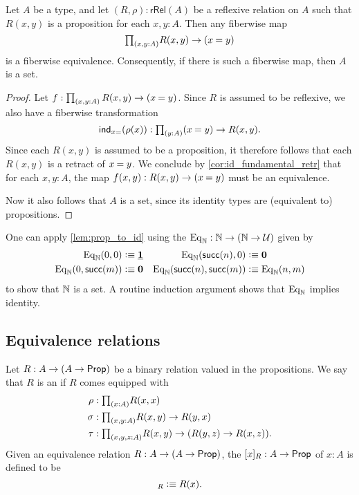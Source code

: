 \begin{lem}\label{lem:prop_to_id}
Let $A$ be a type, and let $(R,\rho):\mathsf{rRel}(A)$ be a reflexive relation on $A$ such that $R(x,y)$ is a proposition for each $x,y:A$. Then any fiberwise map
\begin{equation*}
\prd{x,y:A}R(x,y)\to (\id{x}{y})
\end{equation*}
is a fiberwise equivalence. Consequently, if there is such a fiberwise map, then $A$ is a set.
\end{lem}

\begin{proof}
Let $f:\prd{x,y:A}R(x,y)\to(\id{x}{y})$. 
Since $R$ is assumed to be reflexive, we also have a fiberwise transformation
\begin{equation*}
\ind{x{=}}(\rho(x)):\prd{y:A}(\id{x}{y})\to R(x,y).
\end{equation*}
Since each $R(x,y)$ is assumed to be a proposition, it therefore follows that each $R(x,y)$ is a retract of $\id{x}{y}$. We conclude by \autoref{cor:id_fundamental_retr} that for each $x,y:A$, the map $f(x,y):R(x,y)\to(\id{x}{y})$ must be an equivalence.

Now it also follows that $A$ is a set, since its identity types are (equivalent to) propositions.
\end{proof}

\begin{eg}
One can apply \cref{lem:prop_to_id} using the  $\mathrm{Eq}_\mathbb{N}:\mathbb{N}\to (\mathbb{N}\to\mathcal{U})$ given by
\begin{align*}
\mathrm{Eq}_\mathbb{N}(0,0) & \vcentcolon\equiv \underline{\mathbf{1}} & \mathrm{Eq}_\mathbb{N}(\mathsf{succ}(n),0) & \vcentcolon\equiv \mathbf{0} \\
\mathrm{Eq}_\mathbb{N}(0,\mathsf{succ}(m)) & \vcentcolon\equiv \mathbf{0} & \mathrm{Eq}_\mathbb{N}(\mathsf{succ}(n),\mathsf{succ}(m)) & \vcentcolon\equiv \mathrm{Eq}_\mathbb{N}(n,m)
\end{align*}
to show that $\mathbb{N}$ is a set. A routine induction argument shows that $\mathrm{Eq}_\mathbb{N}$ implies identity.
\end{eg}

\subsection{Equivalence relations}

\begin{defn}\label{defn:eq_rel}
Let $R:A\to (A\to\mathsf{Prop})$ be a binary relation valued in the propositions. We say that $R$ is an  if $R$ comes equipped with
\begin{align*}
\rho & : \prd{x:A}R(x,x) \\
\sigma & : \prd{x,y:A} R(x,y)\to R(y,x) \\
\tau & : \prd{x,y,z:A} R(x,y)\to (R(y,z)\to R(x,z)).
\end{align*}
Given an equivalence relation $R:A\to (A\to\mathsf{Prop})$, the  $[x]_R:A\to\mathsf{Prop}$ of $x:A$ is defined to be
\begin{equation*}
[x]_R\defeq R(x).
\end{equation*}
\end{defn}

